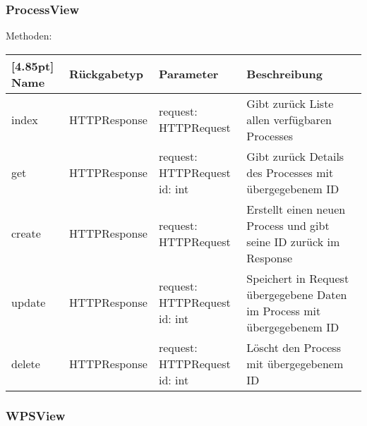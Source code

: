 		\subsubsection{ProcessView}
		
		Methoden:
		\begin{center}
		    \setlength\tabcolsep{5pt}
        	\renewcommand{\arraystretch}{1.5}
            	\begin{tabularx}{\textwidth}{|l|l|l|X|}
            	\hline
            	\rowcolor[gray]{0.75}[4.85pt]
        		Name & Rückgabetyp & Parameter & Beschreibung \\ \hline 
                index & HTTPResponse & request: HTTPRequest & Gibt zurück Liste allen verfügbaren Processes \\ \hline
                get & HTTPResponse & \thead{request: HTTPRequest\\id: int} & Gibt zurück Details des Processes mit übergegebenem ID \\ \hline
                create & HTTPResponse & request: HTTPRequest & Erstellt einen neuen Process und gibt seine ID zurück im Response \\ \hline
                update & HTTPResponse & \thead{request: HTTPRequest\\id: int} & Speichert in Request übergegebene Daten im Process mit übergegebenem ID \\ \hline
                delete & HTTPResponse & \thead{request: HTTPRequest\\id: int} & Löscht den Process mit übergegebenem ID \\ \hline
            	\end{tabularx}
		\end{center}
		
		\subsubsection{WPSView}
		
